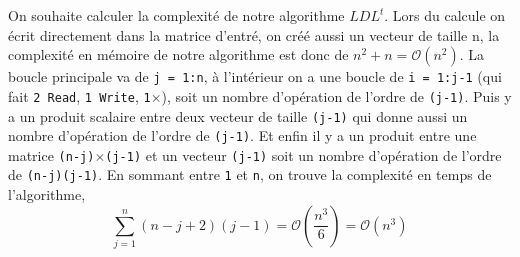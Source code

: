 \documentclass{article}
\begin{document}
On souhaite calculer la complexité de notre algorithme \(LDL^t\).\newline
Lors du calcule on écrit directement dans la matrice d'entré, on créé aussi un vecteur de taille n, la complexité en mémoire de notre algorithme est donc de \(n^2+n = \mathcal{O}(n^2)\).\newline
La boucle principale va de \texttt{j = 1:n}, à l'intérieur on a une boucle de \texttt{i = 1:j-1} (qui fait \texttt{2 Read}, \texttt{1 Write}, \texttt{1}\(\times\)), soit un nombre d'opération de l'ordre de \texttt{(j-1)}.\newline
Puis y a un produit scalaire entre deux vecteur de taille \texttt{(j-1)} qui donne aussi un nombre d'opération de l'ordre de \texttt{(j-1)}. \newline
Et enfin il y a un produit entre une matrice \texttt{(n-j)}\(\times\)\texttt{(j-1)} et un vecteur \texttt{(j-1)} soit un nombre d'opération de l'ordre de \texttt{(n-j)(j-1)}.\newline
En sommant entre \texttt{1} et \texttt{n}, on trouve la complexité en temps de l'algorithme,
\[
\sum_{j=1}^n (n-j+2)(j-1) = \mathcal{O}(\frac{n^3}{6}) = \mathcal{O}(n^3)
\]
\end{document}
